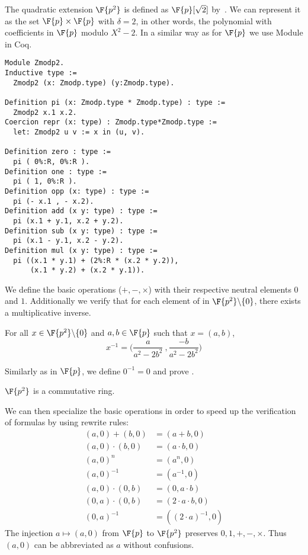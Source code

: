 The quadratic extension $\F{p^2}$ is defined as $\F{p}[\sqrt{2}]$ by~\cite{Ber06}.
We can represent it as the set $\F{p} \times \F{p}$ with $\delta = 2$, in other words,
the polynomial with coefficients in $\F{p}$ modulo $X^2 - 2$. In a similar way
as for $\F{p}$ we use Module in Coq.
\begin{lstlisting}[language=Coq]
Module Zmodp2.
Inductive type :=
  Zmodp2 (x: Zmodp.type) (y:Zmodp.type).

Definition pi (x: Zmodp.type * Zmodp.type) : type :=
  Zmodp2 x.1 x.2.
Coercion repr (x: type) : Zmodp.type*Zmodp.type :=
  let: Zmodp2 u v := x in (u, v).

Definition zero : type :=
  pi ( 0%:R, 0%:R ).
Definition one : type :=
  pi ( 1, 0%:R ).
Definition opp (x: type) : type :=
  pi (- x.1 , - x.2).
Definition add (x y: type) : type :=
  pi (x.1 + y.1, x.2 + y.2).
Definition sub (x y: type) : type :=
  pi (x.1 - y.1, x.2 - y.2).
Definition mul (x y: type) : type :=
  pi ((x.1 * y.1) + (2%:R * (x.2 * y.2)),
      (x.1 * y.2) + (x.2 * y.1)).
\end{lstlisting}
We define the basic operations ($+, -, \times$) with their respective neutral
elements $0$ and $1$. Additionally we verify that for each element of in
$\F{p^2}\backslash\{0\}$, there exists a multiplicative inverse.
\begin{lemma}
  \label{lemma:Zmodp2_inv}
  For all $x \in \F{p^2}\backslash\{0\}$ and $a,b \in \F{p}$ such that $x = (a,b)$,
  $$x^{-1} = \Big(\frac{a}{a^2-2b^2}\ , \frac{-b}{a^2-2b^2}\Big)$$
\end{lemma}
Similarly as in $\F{p}$, we define $0^{-1} = 0$ and prove .
\begin{lemma}
  \label{lemma:Zmodp2_ring}
  $\F{p^2}$ is a commutative ring.
\end{lemma}
We can then specialize the basic operations in order to speed up the verification
of formulas by using rewrite rules:
\begin{align*}
(a,0) + (b,0) &= (a+b, 0)\\
(a,0) \cdot   (b,0) &= (a \cdot b, 0)\\
(a, 0)^n &= (a^n, 0)\\
(a, 0)^{-1} &= (a^{-1}, 0)\\
(a, 0)\cdot (0,b) &= (0, a\cdot b)\\
(0, a)\cdot (0,b) &= (2\cdot a\cdot b, 0)\\
(0,a)^{-1} &= ((2\cdot a)^{-1},0)
\end{align*}
The injection $a \mapsto (a,0)$ from $\F{p}$ to $\F{p^2}$ preserves
$0, 1, +, -, \times$. Thus $(a,0)$ can be abbreviated as $a$ without confusions.

